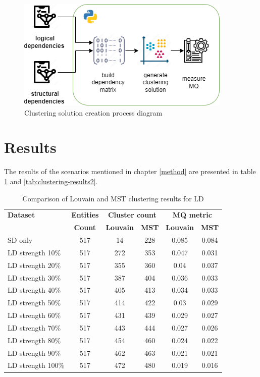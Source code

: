 \documentclass[conference]{IEEEtran}
\begin{document}
\begin{figure}
\centering
\includegraphics[width=\columnwidth]{clustering-generation.png}
\caption{Clustering solution creation process diagram}
\label{fig:clustering-gen}
\centering
\end{figure}


\section{Results}
\label{results}

The results of the scenarios mentioned in chapter \ref{method} are presented in table \ref{tab:clustering-results1} and \ref{tab:clustering-results2}.

\begin{table}[htbp]
  \centering
  \caption{Comparison of Louvain and MST clustering results for LD}
  \label{tab:clustering-results1}
  \begin{tabular}{lc|cc|cc}
    \toprule
    \textbf{Dataset} & \textbf{Entities} & \multicolumn{2}{c}{\textbf{Cluster count}} & \multicolumn{2}{c}{\textbf{MQ metric}} \\
    & \textbf{Count} & \textbf{Louvain} & \textbf{MST} & \textbf{Louvain} & \textbf{MST} \\
    \midrule
    SD only & 517 & 14 & 228 & 0.085 & 0.084 \\
    LD strength 10\% & 517 & 272 & 353 & 0.047 & 0.031 \\
    LD strength 20\% & 517 & 355 & 360 & 0.04 & 0.037 \\
    LD strength 30\% & 517 & 387 & 404 & 0.036 & 0.033 \\
    LD strength 40\% & 517 & 405 & 413 & 0.034 & 0.033 \\
    LD strength 50\% & 517 & 414 & 422 & 0.03 & 0.029 \\
    LD strength 60\% & 517 & 431 & 439 & 0.029 & 0.027 \\
    LD strength 70\% & 517 & 443 & 444 & 0.027 & 0.026 \\
    LD strength 80\% & 517 & 454 & 460 & 0.024 & 0.022 \\
    LD strength 90\% & 517 & 462 & 463 & 0.021 & 0.021 \\
    LD strength 100\% & 517 & 472 & 480 & 0.019 & 0.016 \\
    \bottomrule
  \end{tabular}
\end{table}
\end{document}
